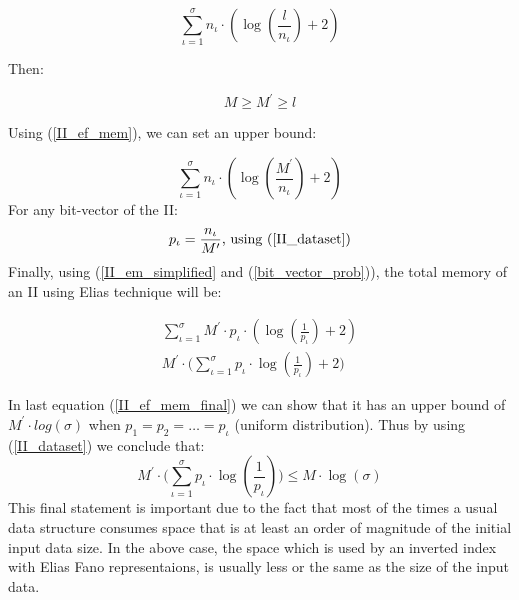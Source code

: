 \begin{equation} \label{II_ef_mem}
\sum_{\iota = 1}^{\sigma} n_{\iota}\cdot ( \log(\frac{l}{n_{\iota}}) + 2 )
\end{equation}

Then:

\begin{equation} \label{II_dataset}
	M\geq M^{\prime} \geq l 
\end{equation} 

Using (\ref{II_ef_mem}), we can set an upper bound:

\begin{equation}\label{II_em_simplified}
	\sum_{\iota = 1}^{\sigma} n_{\iota}\cdot ( \log(\frac{M^{\prime}}{n_{\iota}}) + 2 )
\end{equation}
For any bit-vector of the II:
\begin{equation} \label{bit_vector_prob}
	p_{\iota} = \frac{n_{\iota}}{M^{\prime}} \textnormal{, using (\ref{II_dataset})}
\end{equation}
Finally, using (\ref{II_em_simplified} and (\ref{bit_vector_prob})), the total memory of an II using Elias technique will be:

\begin{equation} \label{II_ef_mem_final}
	\begin{gathered}
		\sum_{\iota = 1}^{\sigma} M^{\prime}\cdot p_{\iota}\cdot ( \log(\frac{1}{p_{\iota}}) + 2 ) \\ 
		M^{\prime}\cdot\Big(\sum_{\iota = 1}^{\sigma} p_{\iota}\cdot \log(\frac{1}{p_{\iota}}) + 2\Big)
	\end{gathered}
\end{equation}

In last equation (\ref{II_ef_mem_final}) we can show that it has an upper bound of $M^{\prime}\cdot log(\sigma)$ when $p_1 = p_2 = \dots = p_\iota$ (uniform distribution). Thus by using (\ref{II_dataset}) we conclude that:
\begin{equation}
	M^{\prime}\cdot\Big(\sum_{\iota = 1}^{\sigma} p_{\iota}\cdot \log(\frac{1}{p_{\iota}})\Big) \leq M\cdot \log(\sigma)
\end{equation}
This final statement is important due to the fact that most of the times a usual data structure consumes space that is at least an order of magnitude of the initial input data size. In the above case, the space which is used by an inverted index with Elias Fano representaions, is usually less or the same as the size of the input data.
